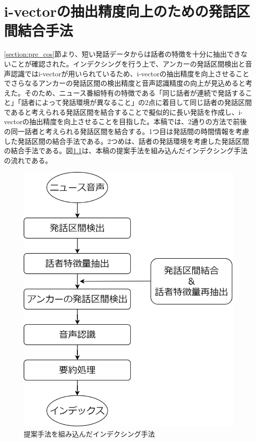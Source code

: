 \chapter{i-vectorの抽出精度向上のための発話区間結合手法}
\label{chapter:prob_method}
\ref{section:pre_cos}節より、短い発話データからは話者の特徴を十分に抽出できないことが確認された。インデクシングを行う上で、アンカーの発話区間検出と音声認識ではi-vectorが用いられているため、i-vectorの抽出精度を向上させることでさらなるアンカーの発話区間の検出精度と音声認識精度の向上が見込めると考えた。そのため、ニュース番組特有の特徴である「同じ話者が連続で発話すること」「話者によって発話環境が異なること」の2点に着目して同じ話者の発話区間であると考えられる発話区間を結合することで擬似的に長い発話を作成し、i-vectorの抽出精度を向上させることを目指した。本稿では、2通りの方法で前後の同一話者と考えられる発話区間を結合する。1つ目は発話間の時間情報を考慮した発話区間の結合手法である。2つめは、話者の発話環境を考慮した発話区間の結合手法である。図\ref{fig:indexing2}は、本稿の提案手法を組み込んだインデクシング手法の流れである。

\begin{figure}[H]
  \begin{center}
    \includegraphics[scale=0.3]{./figure/indexing2.eps}
  \end{center}
  \caption{提案手法を組み込んだインデクシング手法 \label{fig:indexing2}}
\end{figure}

